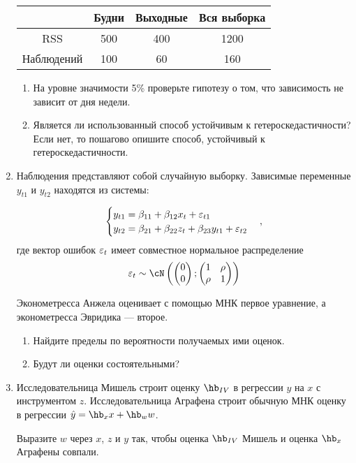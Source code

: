 \documentclass[12pt, a4paper]{article}
\begin{document}
\begin{enumerate}
    \begin{center}
 			\begin{tabular}{c|ccc}
				\toprule
				& Будни & Выходные & Вся выборка \\
				\midrule
                RSS & 500 & 400 & 1200 \\
                Наблюдений & 100 & 60 & 160 \\
				\bottomrule
			\end{tabular}
		\end{center}

\begin{enumerate}
\item На уровне значимости 5\% проверьте гипотезу о том, что зависимость не зависит от дня недели.
\item Является ли использованный способ устойчивым к гетероскедастичности?
Если нет, то пошагово опишите способ, устойчивый к гетероскедастичности.
\end{enumerate}


\item
Наблюдения представляют собой случайную выборку. Зависимые переменные $y_{t1}$ и $y_{t2}$ находятся из системы:

\[
\begin{cases}
y_{t1} = \beta_{11} + \beta_{12} x_t + \varepsilon_{t1} \\
y_{t2} = \beta_{21} + \beta_{22} z_t + \beta_{23} y_{t1} + \varepsilon_{t2}
\end{cases},
\]
где вектор ошибок $\varepsilon_t$ имеет совместное нормальное распределение
\[
\e_t \sim \cN\left(
\begin{pmatrix}
  0 \\
  0
\end{pmatrix};
\begin{pmatrix}
  1 & \rho \\
  \rho & 1
\end{pmatrix}
\right)
\]

Эконометресса Анжела оценивает с помощью МНК первое уравнение, а эконометресса Эвридика — второе.
\begin{enumerate}
\item Найдите пределы по вероятности получаемых ими оценок.
\item Будут ли оценки состоятельными?
\end{enumerate}

\item
Исследовательница Мишель строит оценку $\hb_{IV}$ в регрессии $y$ на $x$ с инструментом $z$.
Исследовательница Аграфена строит обычную МНК оценку в регрессии $\hat y = \hb_{x} x + \hb_{w} w$.

Выразите $w$ через $x$, $z$ и $y$ так, чтобы оценка $\hb_{IV}$ Мишель и оценка $\hb_{x}$ Аграфены совпали.




\end{enumerate}
\end{document}
